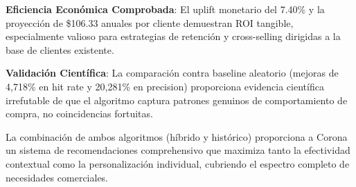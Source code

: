 \documentclass[twocolumn]{article}
\begin{document}
\textbf{Eficiencia Económica Comprobada}: El uplift monetario del 7.40\% y la proyección de \$106.33 anuales por cliente demuestran ROI tangible, especialmente valioso para estrategias de retención y cross-selling dirigidas a la base de clientes existente.

\textbf{Validación Científica}: La comparación contra baseline aleatorio (mejoras de 4,718\% en hit rate y 20,281\% en precision) proporciona evidencia científica irrefutable de que el algoritmo captura patrones genuinos de comportamiento de compra, no coincidencias fortuitas.

La combinación de ambos algoritmos (híbrido y histórico) proporciona a Corona un sistema de recomendaciones comprehensivo que maximiza tanto la efectividad contextual como la personalización individual, cubriendo el espectro completo de necesidades comerciales.
\end{document}
